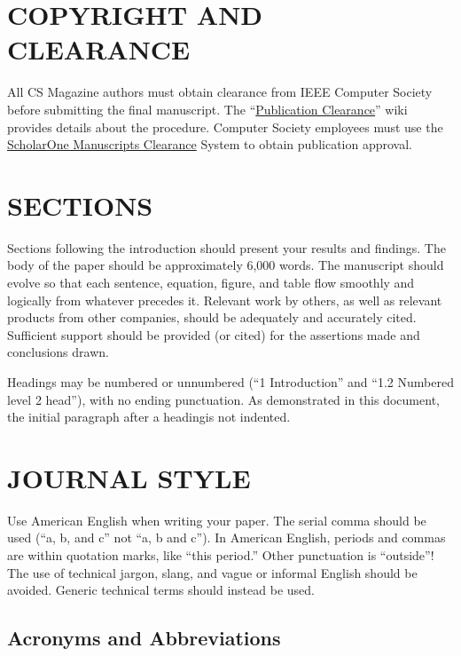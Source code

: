 \documentclass{IEEEcsmag}
\begin{document}
\section{COPYRIGHT AND CLEARANCE}

All CS Magazine authors must obtain clearance from IEEE Computer Society before submitting the final manuscript. The ``\href{https://apps.na.collabserv.com/wikis/home?lang=en-us#!/wiki/W18e544042a85_4b63_915a_1d1ed2cf8338/page/Publication\%20clearance}{Publication Clearance}'' wiki provides details about the procedure. Computer Society employees must use the \href{https://mc.manuscriptcentral.com/cs-ieee}{ScholarOne  Manuscripts Clearance} System to obtain publication approval.

\section{SECTIONS}

Sections following the introduction should present your results and findings. The body of the paper should be approximately 6,000 words. The manuscript should evolve so that each sentence, equation, figure, and table flow smoothly and logically from whatever precedes it. Relevant work by others, as well as relevant products from other companies, should be adequately and accurately cited. Sufficient support should be provided (or cited) for the assertions made and conclusions drawn.

Headings may be numbered or unnumbered (``1 Introduction'' and ``1.2 Numbered level 2 head''), with no ending punctuation. As demonstrated in this document, the initial paragraph after a headingis not indented.

\section{JOURNAL STYLE}

Use American English when writing your paper. The serial comma should be used (``a, b, and c'' not ``a, b and c''). In American English, periods and commas are within quotation marks, like ``this period.'' Other punctuation is ``outside''! The use of technical jargon, slang, and vague or informal English should be avoided. Generic technical terms should instead be used.

\subsection{Acronyms and Abbreviations}
\end{document}
